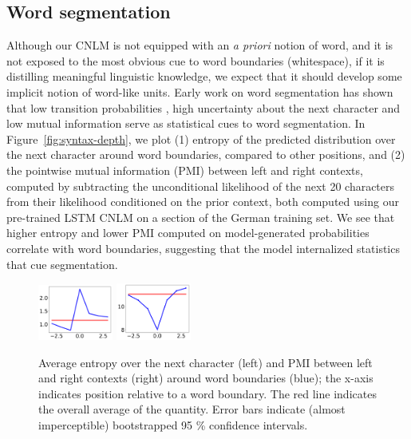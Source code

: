 \subsection{Word segmentation}
\label{sec:segmentation}

Although our CNLM is not equipped with an \emph{a priori} notion of
word, and it is not exposed to the most obvious cue to word boundaries
(whitespace), if it is distilling meaningful linguistic knowledge, we
expect that it should develop some implicit notion of word-like units.
Early work on word segmentation has shown that low transition
probabilities \cite{harris-distributional-1954, saffran-word-1996},
high uncertainty about the next character \cite{cohen-algorithm-2001,
  feng-accessor-2004} and low mutual information
\cite{sun-chinese-1998} serve as statistical cues to word
segmentation.  In Figure~\ref{fig:syntax-depth}, we plot (1) entropy
of the predicted distribution over the next character around word
boundaries, compared to other positions, and (2) the pointwise mutual
information (PMI) between left and right contexts, computed by
subtracting the unconditional likelihood of the next 20 characters
from their likelihood conditioned on the prior context, both computed
using our pre-trained LSTM CNLM on a section of the German training
set.  We see that higher entropy and lower PMI computed on
model-generated probabilities correlate with word boundaries,
suggesting that the model internalized statistics that cue segmentation.

\begin{figure}
	\begin{center}
\includegraphics[width=0.22\textwidth]{figures/segmentation-profile-flattened-entropies-english-ci.pdf}
\includegraphics[width=0.22\textwidth]{figures/segmentation-profile-flattened-pmis-english-ci.pdf}
	\end{center}
	\caption{Average entropy over the next character (left) and PMI between left and right contexts (right) around word boundaries (blue); the x-axis indicates position relative to a word boundary. The red line indicates the overall average of the quantity. Error bars indicate (almost imperceptible) bootstrapped 95 \% confidence intervals.}\label{fig:boundaries-entropy}
\end{figure}

